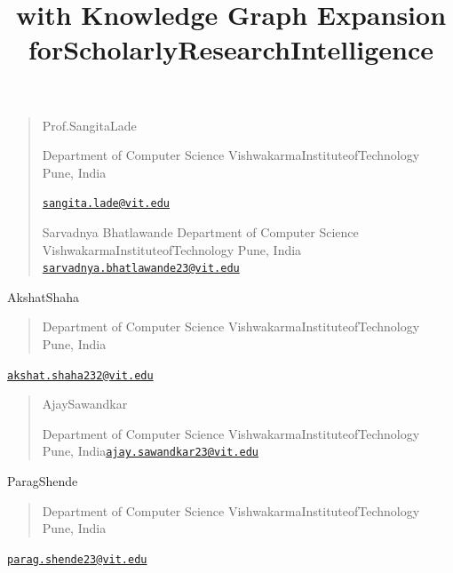 \documentclass[
]{article}
\title{with Knowledge Graph Expansion forScholarlyResearchIntelligence}
\author{}
\date{}
\begin{document}
\maketitle

\begin{quote}
Prof.SangitaLade

Department of Computer Science VishwakarmaInstituteofTechnology Pune, India

\href{mailto:sangita.lade@vit.edu}{\nolinkurl{sangita.lade@vit.edu}}

Sarvadnya Bhatlawande Department of Computer Science VishwakarmaInstituteofTechnology Pune, India \href{mailto:sarvadnya.bhatlawande23@vit.edu}{\nolinkurl{sarvadnya.bhatlawande23@vit.edu}}
\end{quote}

AkshatShaha

\begin{quote}
Department of Computer Science VishwakarmaInstituteofTechnology Pune, India
\end{quote}

\href{mailto:akshat.shaha232@vit.edu}{\nolinkurl{akshat.shaha232@vit.edu}}

\begin{quote}
AjaySawandkar

Department of Computer Science VishwakarmaInstituteofTechnology Pune, India\href{mailto:ajay.sawandkar23@vit.edu}{\nolinkurl{ajay.sawandkar23@vit.edu}}
\end{quote}

ParagShende

\begin{quote}
Department of Computer Science VishwakarmaInstituteofTechnology Pune, India
\end{quote}

\href{mailto:parag.shende23@vit.edu}{\nolinkurl{parag.shende23@vit.edu}}
\end{document}
